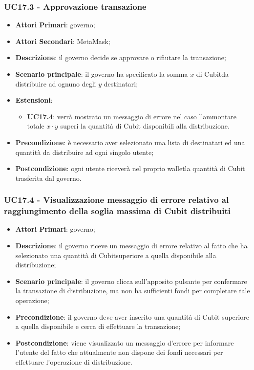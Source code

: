 \subsubsection{UC17.3 - Approvazione transazione}
\begin{itemize}
	\item \textbf{Attori Primari}: governo;
	\item \textbf{Attori Secondari}: MetaMask\glo;
	\item \textbf{Descrizione}: il governo decide se approvare o rifiutare la transazione;
	\item \textbf{Scenario principale}: il governo ha specificato la somma 
	$x$ di Cubit\glosp da distribuire ad ognuno degli $y$ destinatari;
	\item \textbf{Estensioni}:
	\begin{itemize}
		\item \textbf{UC17.4}: verrà mostrato un messaggio di errore nel caso 
		l'ammontare totale $x\cdot y$ superi la quantità di Cubit disponibili 
		alla distribuzione.
	\end{itemize}
	\item \textbf{Precondizione}: è necessario aver selezionato una lista di destinatari ed una quantità da distribuire ad ogni singolo utente;
	\item \textbf{Postcondizione}: ogni utente riceverà nel proprio wallet\glosp la quantità di Cubit trasferita dal governo.
\end{itemize}
\subsubsection{UC17.4 - Visualizzazione messaggio di errore relativo al raggiungimento della soglia massima di Cubit distribuiti}
\begin{itemize}
	\item \textbf{Attori Primari}: governo;
	\item \textbf{Descrizione}: il governo riceve un messaggio di errore relativo al fatto che ha selezionato una quantità di Cubit\glosp superiore a quella disponibile alla distribuzione;
	\item \textbf{Scenario principale}: il governo clicca sull'apposito pulsante per confermare la transazione di distribuzione, ma non ha sufficienti fondi per completare tale operazione;
	\item \textbf{Precondizione}: il governo deve aver inserito una quantità di Cubit superiore a quella disponibile e cerca di effettuare la transazione;
	\item \textbf{Postcondizione}: viene visualizzato un messaggio d'errore per informare l'utente del fatto che attualmente non dispone dei fondi necessari per effettuare l'operazione di distribuzione.
	
\end{itemize} 
